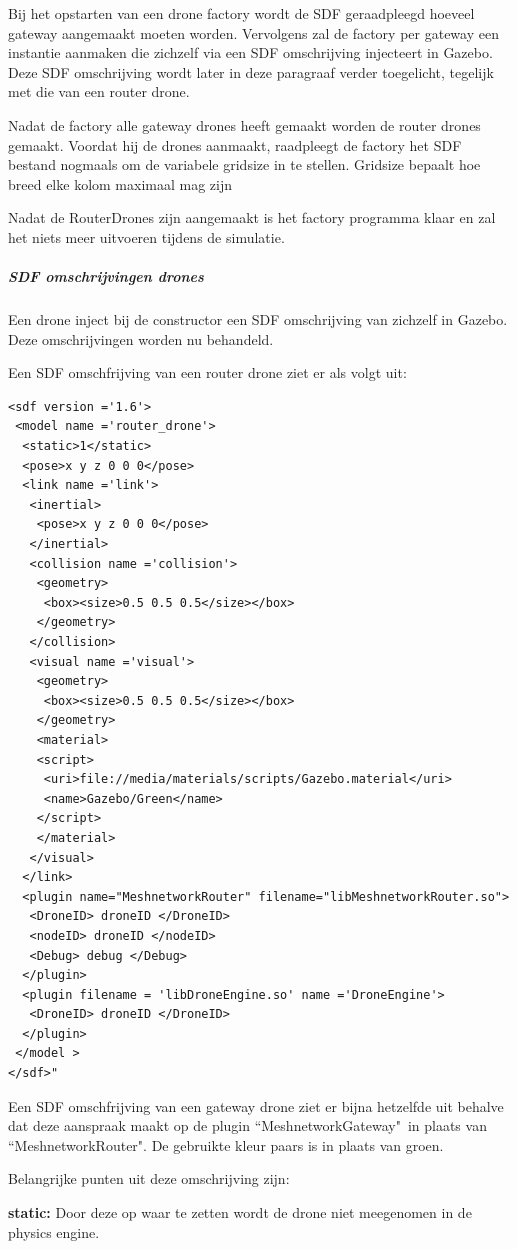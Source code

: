 \documentclass[a4paper, 11pt, oneside]{report}
\begin{document}
Bij het opstarten van een drone factory wordt de SDF geraadpleegd hoeveel gateway aangemaakt moeten worden. 
Vervolgens zal de factory per gateway een instantie aanmaken die zichzelf via een SDF omschrijving injecteert in Gazebo.
Deze SDF omschrijving wordt later in deze paragraaf verder toegelicht, tegelijk met die van een router drone.

Nadat de factory alle gateway drones heeft gemaakt worden de router drones gemaakt.
Voordat hij de drones aanmaakt, raadpleegt de factory het SDF bestand nogmaals om de variabele gridsize in te stellen.
Gridsize bepaalt hoe breed elke kolom maximaal mag zijn

Nadat de RouterDrones zijn aangemaakt is het factory programma klaar en zal het niets meer uitvoeren tijdens de simulatie.

\subparagraph{SDF omschrijvingen drones}
\label{DetailedDesign:MeshNetwerk:sequence:dronefactory:droneomschrijvingen}
Een drone inject bij de constructor een SDF omschrijving van zichzelf in Gazebo.
Deze omschrijvingen worden nu behandeld.

Een SDF omschfrijving van een router drone ziet er als volgt uit:
\begin{lstlisting}
<sdf version ='1.6'>
 <model name ='router_drone'>
  <static>1</static>
  <pose>x y z 0 0 0</pose>
  <link name ='link'>
   <inertial>
    <pose>x y z 0 0 0</pose>
   </inertial>
   <collision name ='collision'>
    <geometry>
     <box><size>0.5 0.5 0.5</size></box>
    </geometry>
   </collision>
   <visual name ='visual'>
    <geometry>
     <box><size>0.5 0.5 0.5</size></box>
    </geometry>
    <material>
    <script>
     <uri>file://media/materials/scripts/Gazebo.material</uri>
     <name>Gazebo/Green</name>
    </script>
    </material>
   </visual>
  </link>
  <plugin name="MeshnetworkRouter" filename="libMeshnetworkRouter.so">
   <DroneID> droneID </DroneID>
   <nodeID> droneID </nodeID>
   <Debug> debug </Debug>
  </plugin>
  <plugin filename = 'libDroneEngine.so' name ='DroneEngine'>
   <DroneID> droneID </DroneID> 
  </plugin>
 </model >
</sdf>"
\end{lstlisting} 

Een SDF omschfrijving van een gateway drone ziet er bijna hetzelfde uit behalve dat deze aanspraak maakt op de plugin ``MeshnetworkGateway"\ in plaats van ``MeshnetworkRouter".  De gebruikte kleur paars is in plaats van groen.

Belangrijke punten uit deze omschrijving zijn:

\textbf{static:} Door deze op waar te zetten wordt de drone niet meegenomen in de physics engine.
\end{document}
